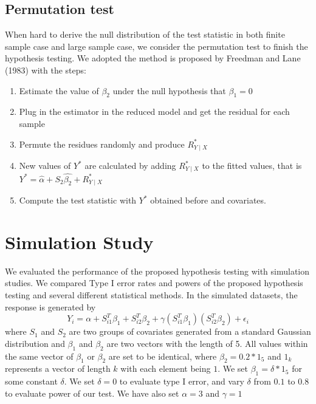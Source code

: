 \documentclass[12pt]{article}
\begin{document}
\subsection{Permutation test}
When hard to derive the null distribution of the test statistic in both finite sample case and large sample case, we consider the permutation test to finish the hypothesis testing. We adopted the method is proposed by Freedman and Lane (1983) with the steps:
\begin{enumerate}
    \item Estimate the value of $\beta_2$ under the null hypothesis that $\beta_1=0$

\item  Plug in the estimator in the reduced model and get the residual for each sample 

\item Permute the residues randomly and produce $R_{Y \mid X}^{*}$ 

\item  New values of $Y^{*}$ are calculated by adding $R_{Y \mid X}^{*}$ to the fitted  values, that is $Y^{*}=\hat\alpha+S_2\hat{\beta_{2}}+R_{Y \mid X}^{*}$ 

\item  Compute the test statistic with $Y^{*}$ obtained before and covariates.

\end{enumerate}

\section{Simulation Study}

We evaluated the performance of the proposed hypothesis testing with simulation studies. We compared Type I error rates and powers of the proposed hypothesis testing and several different statistical methods. In the simulated datasets, the response is generated by
$$
Y_i = \alpha + S_{i1}^T\beta_1 + S_{i2}^T\beta_2 + \gamma (S_{i1}^T\beta_1) (S_{i2}^T\beta_2)+\epsilon_i
$$
where $S_{1}$ and $S_{2}$ are two groups of covariates generated from a standard Gaussian distribution and $\beta_1$ and $\beta_2$ are two vectors with the length of 5. All values within the same vector of $\beta_1$ or $\beta_2$ are set to be identical, where $\beta_2 = 0.2*1_5$ and $1_k$ represents a vector of length $k$ with each element being $1$. We set $\beta_1 = \delta * 1_5$ for some constant $\delta$. We set $\delta = 0$ to evaluate type I error, and vary $\delta$ from  $0.1$ to $0.8$ to evaluate power of our test. We have also set $\alpha=3$ and $\gamma=1$
\end{document}
